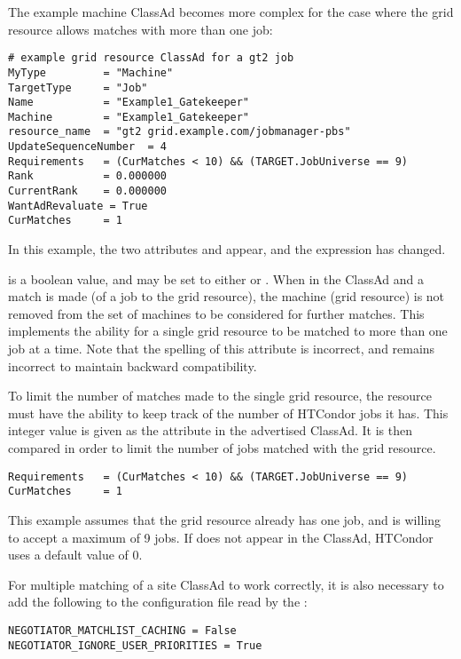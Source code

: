 The example machine ClassAd becomes more complex
for the case where the grid resource allows matches with more
than one job:
\footnotesize
\begin{verbatim}
# example grid resource ClassAd for a gt2 job
MyType         = "Machine"
TargetType     = "Job"
Name           = "Example1_Gatekeeper"
Machine        = "Example1_Gatekeeper"
resource_name  = "gt2 grid.example.com/jobmanager-pbs"
UpdateSequenceNumber  = 4
Requirements   = (CurMatches < 10) && (TARGET.JobUniverse == 9)
Rank           = 0.000000
CurrentRank    = 0.000000
WantAdRevaluate = True
CurMatches     = 1
\end{verbatim}
\normalsize

In this example, the two attributes 
and  appear, and the 
expression has changed.

 is a boolean value, and may be set to
either  or .
When  in the ClassAd and a match is made (of a job
to the grid resource), the machine (grid resource)
is not removed from the set of machines to be considered for
further matches.
This implements the ability for a single grid resource to
be matched to more than one job at a time.
Note that the spelling of this attribute is incorrect,
and remains incorrect to maintain backward compatibility.

To limit the number of matches made to the single grid resource,
the resource must have the ability to keep track of the number 
of HTCondor jobs it has.
This integer value is given as the  attribute
in the advertised ClassAd.
It is then compared in order to limit the number of jobs matched
with the grid resource.
\footnotesize
\begin{verbatim}
Requirements   = (CurMatches < 10) && (TARGET.JobUniverse == 9)
CurMatches     = 1
\end{verbatim}
\normalsize

This example assumes that the grid resource already has
one job, and is willing to accept a maximum of 9 jobs.
If  does not appear in the ClassAd,
HTCondor uses a default value of 0.

For multiple matching of a site ClassAd to work correctly,
it is also necessary to add the following to the configuration file
read by the :

\begin{verbatim}
NEGOTIATOR_MATCHLIST_CACHING = False
NEGOTIATOR_IGNORE_USER_PRIORITIES = True
\end{verbatim}

